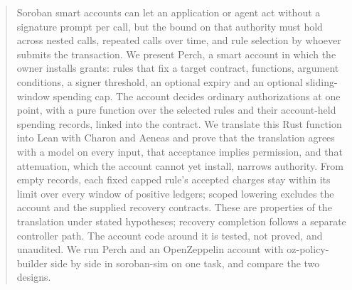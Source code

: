 \begin{abstract}
Soroban smart accounts can let an application or agent act without a signature
prompt per call, but the bound on that authority must hold across nested calls,
repeated calls over time, and rule selection by whoever submits the
transaction. We present Perch, a smart account in which the owner installs
grants: rules that fix a target contract, functions, argument conditions, a
signer threshold, an optional expiry and an optional sliding-window spending
cap. The account decides ordinary authorizations at one point, with a pure function
over the selected rules and their account-held spending records, linked into
the contract. We translate this Rust function into Lean with Charon and Aeneas
and prove that the translation agrees with a model on every input, that
acceptance implies permission, and that attenuation, which the account cannot yet
install, narrows authority. From empty records, each fixed capped rule's
accepted charges stay within its limit over every window of positive ledgers;
scoped lowering excludes the account and the supplied recovery contracts.
These are properties of the translation under stated hypotheses; recovery
completion follows a separate controller path.
The account code around it is tested,
not proved, and unaudited. We
run Perch and an OpenZeppelin account with oz-policy-builder side by side in
soroban-sim on one task, and compare the two designs.
\end{abstract}
